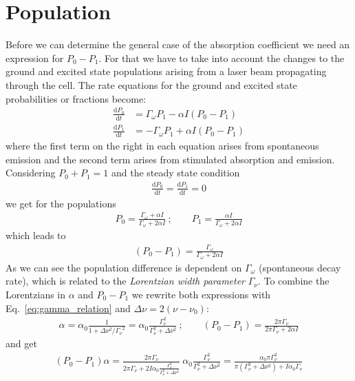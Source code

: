 \section{Population}   %
Before we can determine the general case of the absorption coefficient we need an expression for \(P_0-P_1 \).
For that we have to take into account the changes to the ground and excited state populations arising
from a laser beam propagating through the cell. The rate equations for the ground and excited state
probabilities or fractions become:
\begin{align}
    \frac{\mathrm{d}P_0}{\mathrm{d}t} &= \Gamma_\omega P_1 - \alpha I (P_0-P_1) \nonumber \\
    \frac{\mathrm{d}P_1}{\mathrm{d}t} &= -\Gamma_\omega P_1 + \alpha I (P_0-P_1)
\end{align} 
where the first term on the right in each equation arises from spontaneous emission and the second term
arises from stimulated absorption and emission.\\
Considering \(P_0+P_1=1 \) and the steady state condition
\begin{align}
    \frac{\mathrm{d}P_0}{\mathrm{d}t} = \frac{\mathrm{d}P_1}{\mathrm{d}t} = 0
\end{align}
we get for the populations
\begin{align}
        P_0 = \frac{\Gamma_\omega + \alpha I}{\Gamma_\omega + 2 \alpha I}~; \qquad
        P_1 = \frac{\alpha I}{\Gamma_\omega + 2 \alpha I}
\end{align}
which leads to
\begin{align}
    (P_0-P_1) = \frac{\Gamma_\omega}{\Gamma_\omega + 2 \alpha I} 
\end{align}
As we can see the population difference is dependent on \(\Gamma_\omega \) (spontaneous decay rate),
which is related to the \textit{Lorentzian width parameter} \(\Gamma_\nu \).
To combine the Lorentzians in \(\alpha \) and \(P_0-P_1 \) we rewrite both expressions with 
Eq.~\ref{eq:gamma_relation} and \(\Delta\nu = 2(\nu-\nu_0) \):
\begin{align}
    \alpha = \alpha_0\frac{1}{ 1+ \Delta\nu^2 / {\Gamma_\nu}^2 } 
                           = \alpha_0\frac{\Gamma_\nu^2}{\Gamma_\nu^2 + \Delta\nu^2}~; \qquad
    (P_0-P_1) = \frac{2\pi\Gamma_\nu}{2\pi\Gamma_\nu + 2 \alpha I}
\end{align}
and get
\begin{align}
    (P_0-P_1)\alpha = \frac{2\pi\Gamma_\nu}{2\pi\Gamma_\nu + 2I \alpha_0\frac{\Gamma_\nu^2}{\Gamma_\nu^2 + \Delta\nu^2}}~ 
    \alpha_0\frac{\Gamma_\nu^2}{\Gamma_\nu^2 + \Delta\nu^2} = \frac{\alpha_0\pi\Gamma_\nu^2}{\pi(\Gamma_\nu^2 + \Delta\nu^2)+I\alpha_0\Gamma_\nu}
\end{align}
